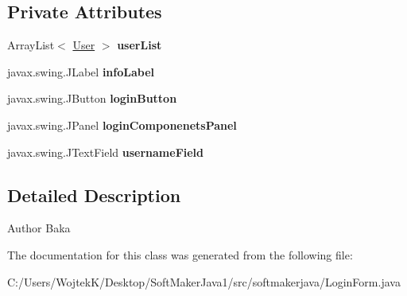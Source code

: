 \subsection*{Private Attributes}
\begin{DoxyCompactItemize}
\item 
Array\+List$<$ \hyperlink{classsoftmakerjava_1_1_user}{User} $>$ {\bfseries user\+List}\hypertarget{classsoftmakerjava_1_1_login_form_ae174d7c341fc040d7ada34a7fd529d63}{}\label{classsoftmakerjava_1_1_login_form_ae174d7c341fc040d7ada34a7fd529d63}

\item 
javax.\+swing.\+J\+Label {\bfseries info\+Label}\hypertarget{classsoftmakerjava_1_1_login_form_a3ffd9fed6d9a3ab5cc7dcc5515e17417}{}\label{classsoftmakerjava_1_1_login_form_a3ffd9fed6d9a3ab5cc7dcc5515e17417}

\item 
javax.\+swing.\+J\+Button {\bfseries login\+Button}\hypertarget{classsoftmakerjava_1_1_login_form_a7fa501ae873a8a60b2cc7c04462d7893}{}\label{classsoftmakerjava_1_1_login_form_a7fa501ae873a8a60b2cc7c04462d7893}

\item 
javax.\+swing.\+J\+Panel {\bfseries login\+Componenets\+Panel}\hypertarget{classsoftmakerjava_1_1_login_form_a3c99b03811013db337563a9ee035263f}{}\label{classsoftmakerjava_1_1_login_form_a3c99b03811013db337563a9ee035263f}

\item 
javax.\+swing.\+J\+Text\+Field {\bfseries username\+Field}\hypertarget{classsoftmakerjava_1_1_login_form_a7abc2803be9aba93267fb2b3bbe3835f}{}\label{classsoftmakerjava_1_1_login_form_a7abc2803be9aba93267fb2b3bbe3835f}

\end{DoxyCompactItemize}


\subsection{Detailed Description}
\begin{DoxyAuthor}{Author}
Baka 
\end{DoxyAuthor}


The documentation for this class was generated from the following file\+:\begin{DoxyCompactItemize}
\item 
C\+:/\+Users/\+Wojtek\+K/\+Desktop/\+Soft\+Maker\+Java1/src/softmakerjava/Login\+Form.\+java\end{DoxyCompactItemize}

